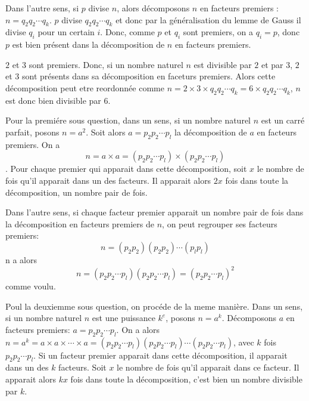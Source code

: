 Dans l'autre sens, si \(p\) divise \(n\), alors décomposons \(n\) en facteurs premiers : \(n = q_2 q_2 \cdots q_{k}\). \(p\) divise \(q_2 q_2 \cdots q_{k}\) et donc par la généralisation du lemme de Gauss il divise \(q_{i}\) pour un certain \(i\). Donc, comme \(p\) et \(q_{i}\) sont premiers, on a \(q_{i} = p\), donc \(p\) est bien présent dans la décomposition de \(n\) en facteurs premiers.

\sol

\(2\) et \(3\) sont premiers. Donc, si un nombre naturel \(n\) est divisible par \(2\) et par \(3\), \(2\) et \(3\) sont présents dans sa décomposition en faceturs premiers. Alors cette décomposition peut etre reordonnée comme \(n = 2 \times 3 \times q_2 q_2 \cdots q_{k} = 6 \times q_2 q_2 \cdots q_{k}\), \(n\) est donc bien divisible par \(6\).

\sol

Pour la premiére sous question, dans un sens, si un nombre naturel \(n\) est un carré parfait, posons \(n = a^2\). Soit alors \(a = p_2 p_2 \cdots p_{l}\) la décomposition de \(a\) en facteurs premiers. On a
\[n = a \times a = \left(p_2 p_2 \cdots p_{l}\right) \times \left(p_2 p_2 \cdots p_{l}\right)\]. Pour chaque premier qui apparait dans cette décomposition, soit \(x\) le nombre de fois qu'il apparait dans un des facteurs. Il apparait alors \(2x\) fois dans toute la décomposition, un nombre pair de fois.

Dans l'autre sens, si chaque facteur premier apparait un nombre pair de fois dans la décomposition en facteurs premiers de \(n\), on peut regrouper ses facteurs premiers:
\[n = \left(p_2 p_2\right)\left(p_2 p_2\right) \cdots \left(p_{l} p_{l}\right)\]
n a alors
\[n = \left(p_2 p_2 \cdots p_{l}\right) \left(p_2 p_2 \cdots p_{l}\right) = \left(p_2 p_2 \cdots p_{l}\right)^2\]
comme voulu.

Poul la deuxiemme sous question, on procéde de la meme manière.
Dans un sens, si un nombre naturel \(n\) est
une puissance \(k^{e}\), posons \(n=a^{k}\).
Décomposons \(a\) en facteurs premiers: \(a = p_2 p_2 \cdots p_{l}\). On a alors \(n = a^{k} = a \times a \times \cdots \times a = \left(p_2 p_2 \cdots p_{l}\right) \left(p_2 p_2 \cdots p_{l}\right) \cdots \left(p_2 p_2 \cdots p_{l}\right)\), avec \(k\) fois \(p_2 p_2 \cdots p_{l}\). Si un facteur premier apparait dans cette décomposition, il apparait dans un des \(k\) facteurs. Soit \(x\) le nombre de fois qu'il apparait dans ce facteur. Il apparait alors \(kx\) fois dans toute la décomposition, c'est bien un nombre divisible par \(k\).

